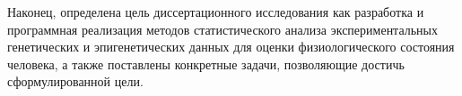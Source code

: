 Наконец, определена цель диссертационного исследования как разработка и программная реализация методов статистического анализа экспериментальных генетических и эпигенетических данных для оценки физиологического состояния человека, а также поставлены конкретные задачи, позволяющие достичь сформулированной цели.


\FloatBarrier
